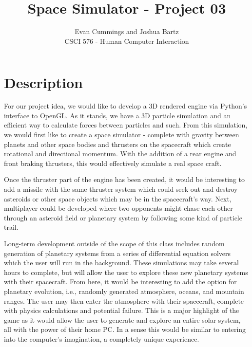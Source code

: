 
\DeclareMathOperator*{\argmax}{arg\,max}


\small

\title{Space Simulator - Project 03}
\author{Evan Cummings and Joshua Bartz\\
CSCI 576 - Human Computer Interaction}

\maketitle

\section{Description}

For our project idea, we would like to develop a 3D rendered engine via Python's interface to OpenGL.  As it stands, we have a 3D particle simulation and an efficient way to calculate forces between particles and such.  From this simulation, we would first like to create a space simulator - complete with gravity between planets and other space bodies and thrusters on the spacecraft which create rotational and directional momentum.  With the addition of a rear engine and front braking thrusters, this would effectively simulate a real space craft.  

Once the thruster part of the engine has been created, it would be interesting to add a missile with the same thruster system which could seek out and destroy asteroids or other space objects which may be in the spacecraft's way.  Next, multiplayer could be developed where two opponents might chase each other through an asteroid field or planetary system by following some kind of particle trail.  

Long-term development outside of the scope of this class includes random generation of planetary systems from a series of differential equation solvers which the user will run in the background.  These simulations may take several hours to complete, but will allow the user to explore these new planetary systems with their spacecraft.  From here, it would be interesting to add the option for planetary evolution, i.e., randomly generated atmosphere, oceans, and mountain ranges.  The user may then enter the atmosphere with their spacecraft, complete with physics calculations and potential failure.  This is a major highlight of the game as it would allow the user to generate and explore an entire solar system, all with the power of their home PC.  In a sense this would be similar to entering into the computer's imagination, a completely unique experience.

